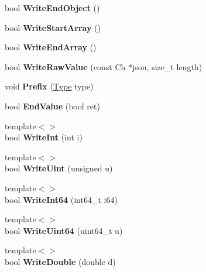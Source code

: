 \begin{DoxyCompactItemize}
bool {\bfseries Write\+End\+Object} ()
\item 
\mbox{\label{a02224_a3c3560a96cac58f98f4a74d6cb227204}} 
bool {\bfseries Write\+Start\+Array} ()
\item 
\mbox{\label{a02224_aabda2df1be6e83cef416e9b1f042e8f4}} 
bool {\bfseries Write\+End\+Array} ()
\item 
\mbox{\label{a02224_a8ee1135b2595261819b134907f67614e}} 
bool {\bfseries Write\+Raw\+Value} (const Ch $\ast$json, size\+\_\+t length)
\item 
\mbox{\label{a02224_a1fc40f8b9f3abc2548c0c5782ce1755d}} 
void {\bfseries Prefix} (\hyperlink{a00560_a1d1cfd8ffb84e947f82999c682b666a7}{Type} type)
\item 
\mbox{\label{a02224_adc1cadbabc309d31f19cf7463251d879}} 
bool {\bfseries End\+Value} (bool ret)
\item 
\mbox{\label{a02224_abefb163a93b376d056edecad5a7a82ef}} 
{\footnotesize template$<$$>$ }\\bool {\bfseries Write\+Int} (int i)
\item 
\mbox{\label{a02224_a9665a4a1549b286944b21927b80060cf}} 
{\footnotesize template$<$$>$ }\\bool {\bfseries Write\+Uint} (unsigned u)
\item 
\mbox{\label{a02224_a3528a42394d50f3b92659de517433c85}} 
{\footnotesize template$<$$>$ }\\bool {\bfseries Write\+Int64} (int64\+\_\+t i64)
\item 
\mbox{\label{a02224_a025b3d2ca07d539a7067575e95f5578d}} 
{\footnotesize template$<$$>$ }\\bool {\bfseries Write\+Uint64} (uint64\+\_\+t u)
\item 
\mbox{\label{a02224_af317e1d24249b8c68503a6253c703bd2}} 
{\footnotesize template$<$$>$ }\\bool {\bfseries Write\+Double} (double d)
\end{DoxyCompactItemize}
